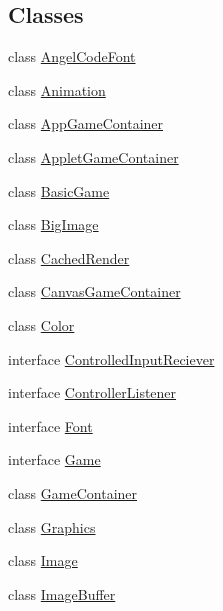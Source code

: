 \subsection*{Classes}
\begin{DoxyCompactItemize}
\item 
class \mbox{\hyperlink{classorg_1_1newdawn_1_1slick_1_1_angel_code_font}{Angel\+Code\+Font}}
\item 
class \mbox{\hyperlink{classorg_1_1newdawn_1_1slick_1_1_animation}{Animation}}
\item 
class \mbox{\hyperlink{classorg_1_1newdawn_1_1slick_1_1_app_game_container}{App\+Game\+Container}}
\item 
class \mbox{\hyperlink{classorg_1_1newdawn_1_1slick_1_1_applet_game_container}{Applet\+Game\+Container}}
\item 
class \mbox{\hyperlink{classorg_1_1newdawn_1_1slick_1_1_basic_game}{Basic\+Game}}
\item 
class \mbox{\hyperlink{classorg_1_1newdawn_1_1slick_1_1_big_image}{Big\+Image}}
\item 
class \mbox{\hyperlink{classorg_1_1newdawn_1_1slick_1_1_cached_render}{Cached\+Render}}
\item 
class \mbox{\hyperlink{classorg_1_1newdawn_1_1slick_1_1_canvas_game_container}{Canvas\+Game\+Container}}
\item 
class \mbox{\hyperlink{classorg_1_1newdawn_1_1slick_1_1_color}{Color}}
\item 
interface \mbox{\hyperlink{interfaceorg_1_1newdawn_1_1slick_1_1_controlled_input_reciever}{Controlled\+Input\+Reciever}}
\item 
interface \mbox{\hyperlink{interfaceorg_1_1newdawn_1_1slick_1_1_controller_listener}{Controller\+Listener}}
\item 
interface \mbox{\hyperlink{interfaceorg_1_1newdawn_1_1slick_1_1_font}{Font}}
\item 
interface \mbox{\hyperlink{interfaceorg_1_1newdawn_1_1slick_1_1_game}{Game}}
\item 
class \mbox{\hyperlink{classorg_1_1newdawn_1_1slick_1_1_game_container}{Game\+Container}}
\item 
class \mbox{\hyperlink{classorg_1_1newdawn_1_1slick_1_1_graphics}{Graphics}}
\item 
class \mbox{\hyperlink{classorg_1_1newdawn_1_1slick_1_1_image}{Image}}
\item 
class \mbox{\hyperlink{classorg_1_1newdawn_1_1slick_1_1_image_buffer}{Image\+Buffer}}
\item 

\end{DoxyCompactItemize}
